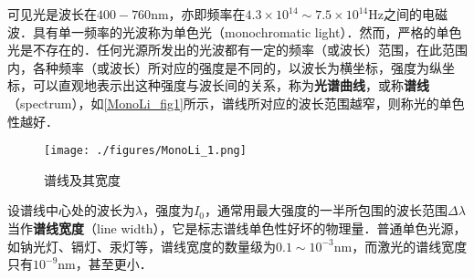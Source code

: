 
可见光是波长在$400-760\mathrm{nm}$，亦即频率在$4.3 \times 10^{14} \sim 7.5 \times 10^{14} \mathrm{Hz}$之间的电磁波．具有单一频率的光波称为单色光（monochromatic light）．然而，严格的单色光是不存在的．任何光源所发出的光波都有一定的频率（或波长）范围，在此范围内，各种频率（或波长）所对应的强度是不同的，以波长为横坐标，强度为纵坐标，可以直观地表示出这种强度与波长间的关系，称为\textbf{光谱曲线}，或称\textbf{谱线}（spectrum），如\autoref{MonoLi_fig1}所示，谱线所对应的波长范围越窄，则称光的单色性越好．
\begin{figure}[ht]
\centering
\texttt{[image: ./figures/MonoLi\_1.png]}
\caption{谱线及其宽度} \label{MonoLi_fig1}
\end{figure}

设谱线中心处的波长为$\lambda$，强度为$I_0$，通常用最大强度的一半所包围的波长范围$\Delta\lambda$当作\textbf{谱线宽度}（line width），它是标志谱线单色性好坏的物理量．普通单色光源，如钠光灯、镉灯、汞灯等，谱线宽度的数量级为$0.1 \sim 10^{-3} \mathrm{nm}$，而激光的谱线宽度只有$10^{-9}\mathrm{nm}$，甚至更小．